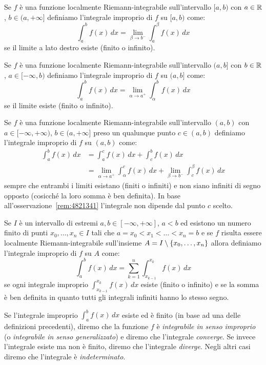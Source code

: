 \begin{definition}
\label{def:integrale_improprio}
Se $f$ è una funzione localmente Riemann-integrabile sull'intervallo $[a,b)$
con $a\in {\mathbb R}$, $b\in (a,+\infty]$ definiamo l'integrale improprio
di $f$ su $[a,b)$ come:
\[
  \int_a^b f(x)\, dx = \lim_{\beta \to b^-} \int_a^\beta f(x)\, dx
\]
se il limite a lato destro esiste (finito o infinito).

Se $f$ è una funzione localmente Riemann-integrabile sull'intervallo $(a,b]$
con $b\in {\mathbb R}$, $a\in [-\infty,b)$ definiamo l'integrale improprio
di $f$ su $(a,b]$ come:
\[
  \int_a^b f(x)\, dx = \lim_{\alpha \to a^+} \int_\alpha^b f(x)\, dx
\]
se il limite esiste (finito o infinito).

Se $f$ è una funzione localmente Riemann-integrabile sull'intervallo $(a,b)$
con $a\in [-\infty,+\infty)$, $b\in(a,+\infty]$ preso un qualunque
punto $c\in (a,b)$
definiamo l'integrale improprio di $f$ su $(a,b)$ come:
\begin{align*}
  \int_a^b f(x)\, dx &=
  \int_a^c f(x)\, dx + \int_c^b f(x)\, dx \\
  &= \lim_{\alpha \to a^+}\int_\alpha^c f(x)\,dx
    + \lim_{\beta\to b^-}\int_c^\beta f(x)\, dx
\end{align*}
sempre che entrambi i limiti esistano (finiti o infiniti) e non siano infiniti
di segno opposto (cosicché la loro somma è ben definita). In base
all'osservazione~\ref{rem:4821341} l'integrale non dipende
dal punto $c$ scelto.

Se $I$ è un intervallo di estremi $a,b\in [-\infty, +\infty]$, $a<b$
ed esistono un numero finito di punti $x_0,\dots,x_n \in I$ tali che
$a = x_0 < x_1 < \dots < x_n = b$ e se
$f$ risulta essere localmente Riemann-integrabile sull'insieme
$A=I\setminus{\left\{ x_0, \dots, x_n \right\}}$ allora definiamo
l'integrale improprio di $f$ su $A$ come:
\[
  \int_a^b f(x)\, dx = \sum_{k=1}^n \int_{x_{k-1}}^{x_k} f(x)\, dx
\]
se ogni integrale improprio $\int_{x_{k-1}}^{x_k} f(x)\, dx$ esiste (finito o infinito)
e se la somma è ben definita in quanto tutti gli integrali infiniti
hanno lo stesso segno.

Se l'integrale improprio $\int_a^b f(x)\, dx$ esiste ed è finito
(in base ad una delle definizioni precedenti), diremo che
la funzione $f$ è
\emph{integrabile in senso improprio}
(o \emph{integrabile in senso generalizzato})
e diremo che l'integrale \emph{converge}.
%
%
%
%
Se invece l'integrale esiste ma non è finito, diremo che l'integrale
\emph{diverge}.
%
%
%
%
Negli altri casi diremo che l'integrale è
\emph{indeterminato}.
%
%
%


\end{definition}
